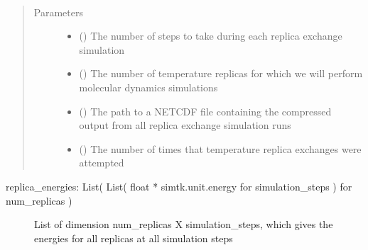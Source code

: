 \documentclass[letterpaper,12pt,english,openany,oneside]{sphinxmanual}
\begin{document}
\begin{fulllineitems}
\label{\detokenize{simulation:simulation.rep_exch.get_replica_energies}}~\begin{quote}\begin{description}
\item[{Parameters}] \leavevmode\begin{itemize}
\item {} 
 () \textendash{} The number of steps to take during each replica exchange simulation

\item {} 
 () \textendash{} The number of temperature replicas for which we will perform molecular dynamics simulations

\item {} 
 () \textendash{} The path to a NETCDF file containing the compressed output from all replica exchange simulation runs

\item {} 
 () \textendash{} The number of times that temperature replica exchanges were attempted

\end{itemize}

\end{description}\end{quote}
\begin{description}
\item[{replica\_energies: List( List( float * simtk.unit.energy for simulation\_steps ) for num\_replicas )}] \leavevmode
List of dimension num\_replicas X simulation\_steps, which gives the energies for all replicas at all simulation steps

\end{description}

\end{fulllineitems}
\end{document}
